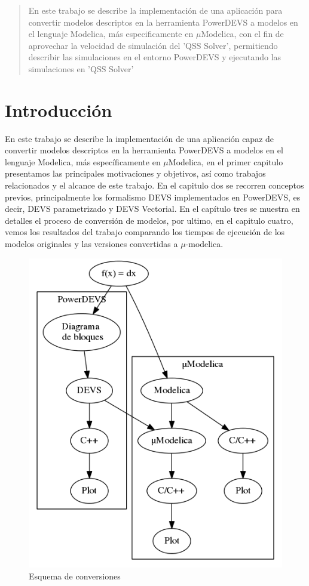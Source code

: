 \documentclass[a4paper,	11pt]{report}
\begin{document}
\tableofcontents

\begin{abstract}
En este trabajo se describe la implementación de una aplicación para convertir modelos descriptos en la herramienta PowerDEVS\cite{BK11} a modelos en el lenguaje Modelica\cite{Fritzson02modelica--}, más especificamente en $\mu$Modelica\cite{Ber12}, con el fin de aprovechar la velocidad de simulación del 'QSS Solver', permitiendo describir las simulaciones en el entorno PowerDEVS y ejecutando las simulaciones en 'QSS Solver'\cite{Fer12}
\end{abstract}


\chapter{Introducción}

En este trabajo se describe la implementación de una aplicación capaz de convertir modelos descriptos en la herramienta PowerDEVS\cite{BK11} a modelos en el lenguaje Modelica\cite{Fritzson02modelica--}, más específicamente en $\mu$Modelica\cite{Ber12}, en el primer capitulo presentamos las principales motivaciones y objetivos, así como trabajos relacionados y el alcance de este trabajo. En el capitulo dos se recorren conceptos previos, principalmente los formalismo DEVS implementados en PowerDEVS, es decir, DEVS parametrizado y DEVS Vectorial. En el capítulo tres se muestra en detalles el proceso de conversión de modelos, por ultimo, en el capitulo cuatro, vemos los resultados del trabajo comparando los tiempos de ejecución de los modelos originales y las versiones convertidas a $\mu$-modelica.

\begin{figure}[H]
\centering
 \includegraphics[width=0.75\linewidth]{esquema}
 \caption{Esquema de conversiones}
 \label{fig:esquema}
\end{figure}
\end{document}
